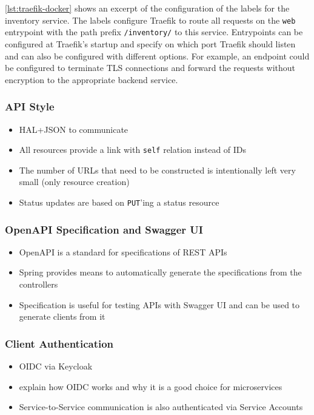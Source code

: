 \autoref{lst:traefik-docker} shows an excerpt of the configuration of the labels for the inventory service.
The labels configure Traefik to route all requests on the \texttt{web} entrypoint with the path prefix \texttt{/inventory/} to this service.
Entrypoints can be configured at Traefik's startup and specify on which port Traefik should listen and can also be configured with different options.
For example, an endpoint could be configured to terminate \ac{TLS} connections and forward the requests without encryption to the appropriate backend service.

\subsubsection{\acs{API} Style}

\begin{itemize}
    \item \acs{HAL}+\acs{JSON} to communicate
    \item All resources provide a link with \texttt{self} relation instead of IDs
    \item The number of \acp{URL} that need to be constructed is intentionally left very small (only resource creation)
    \item Status updates are based on \texttt{PUT}'ing a status resource
\end{itemize}

\subsubsection{OpenAPI Specification and Swagger UI}

\begin{itemize}
    \item OpenAPI is a standard for specifications of REST APIs
    \item Spring provides means to automatically generate the specifications from the controllers
    \item Specification is useful for testing APIs with Swagger UI and can be used to generate clients from it
\end{itemize}

\subsubsection{Client Authentication}

\begin{itemize}
    \item OIDC via Keycloak
    \item explain how OIDC works and why it is a good choice for microservices
    \item Service-to-Service communication is also authenticated via Service Accounts
\end{itemize}

